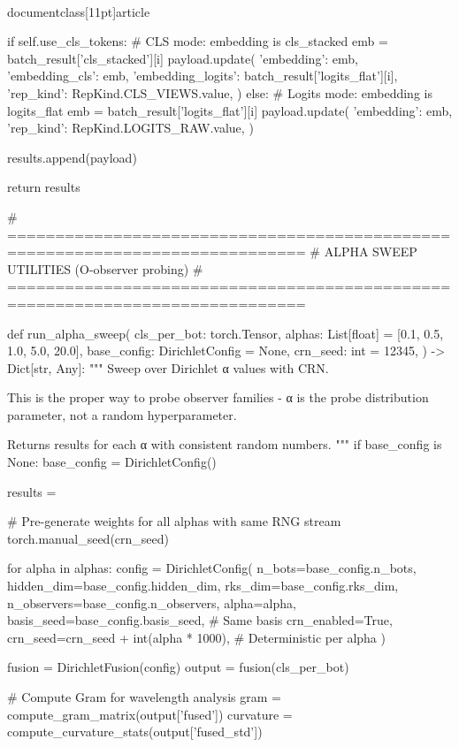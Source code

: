 \\documentclass[11pt]{article}
\begin{document}
\begin{CodeBlock}
            if self.use_cls_tokens:
                # CLS mode: embedding is cls_stacked
                emb = batch_result['cls_stacked'][i]
                payload.update({
                    'embedding': emb,
                    'embedding_cls': emb,
                    'embedding_logits': batch_result['logits_flat'][i],
                    'rep_kind': RepKind.CLS_VIEWS.value,
                })
            else:
                # Logits mode: embedding is logits_flat
                emb = batch_result['logits_flat'][i]
                payload.update({
                    'embedding': emb,
                    'rep_kind': RepKind.LOGITS_RAW.value,
                })

            results.append(payload)

        return results


# =============================================================================
# ALPHA SWEEP UTILITIES (O-observer probing)
# =============================================================================

def run_alpha_sweep(
    cls_per_bot: torch.Tensor,
    alphas: List[float] = [0.1, 0.5, 1.0, 5.0, 20.0],
    base_config: DirichletConfig = None,
    crn_seed: int = 12345,
) -> Dict[str, Any]:
    """
    Sweep over Dirichlet α values with CRN.
    
    This is the proper way to probe observer families -
    α is the probe distribution parameter, not a random hyperparameter.
    
    Returns results for each α with consistent random numbers.
    """
    if base_config is None:
        base_config = DirichletConfig()
    
    results = {}
    
    # Pre-generate weights for all alphas with same RNG stream
    torch.manual_seed(crn_seed)
    
    for alpha in alphas:
        config = DirichletConfig(
            n_bots=base_config.n_bots,
            hidden_dim=base_config.hidden_dim,
            rks_dim=base_config.rks_dim,
            n_observers=base_config.n_observers,
            alpha=alpha,
            basis_seed=base_config.basis_seed,  # Same basis
            crn_enabled=True,
            crn_seed=crn_seed + int(alpha * 1000),  # Deterministic per alpha
        )
        
        fusion = DirichletFusion(config)
        output = fusion(cls_per_bot)
        
        # Compute Gram for wavelength analysis
        gram = compute_gram_matrix(output['fused'])
        curvature = compute_curvature_stats(output['fused_std'])
        

\end{CodeBlock}
\end{document}
